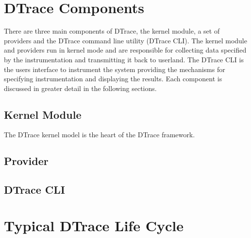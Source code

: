 

\section{DTrace Components}

There are three main components of DTrace, the kernel module, a set of providers and the DTrace command line utility (DTrace CLI). The kernel module and providers run in kernel mode and are responsible for collecting data specified by the instrumentation and transmitting it back to userland. The DTrace CLI is the users interface to instrument the system providing the mechanisms for specifying instrumentation and displaying the results. Each component is discussed in greater detail in the following sections.

\subsection{Kernel Module}

The DTrace kernel model is the heart of the DTrace framework. 


\subsection{Provider}



\subsection{DTrace CLI}


\section{Typical DTrace Life Cycle}

